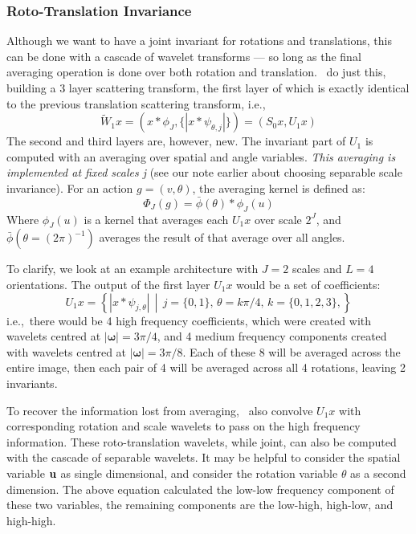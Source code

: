 \subsubsection{Roto-Translation Invariance}
  Although we want to have a joint invariant for rotations and translations,
  this can be done with a cascade of wavelet transforms --- so long as the
  final averaging operation is done over both rotation and translation. \Sifre\
  do just this, building a 3 layer scattering transform, the first layer of
  which is exactly identical to the previous translation scattering transform,
  i.e.,\
  \begin{equation}
    \tilde{W}_1 x = \left( x \ast \phi_J, \{|x \ast \psi_{\theta, j}|\} \right)
      = (S_0x, U_1x)
  \end{equation}
  The second and third layers are, however, new. The invariant part of $U_1$ is
  computed with an averaging over spatial and angle variables. \emph{This
  averaging  is implemented at fixed scales j} (see our note earlier about
  choosing separable scale invariance). For an action $g = (v, \theta)$, the
  averaging kernel is defined as:
  \begin{equation}
    \Phi_J(g) =  \bar{\phi}(\theta) \ast \phi_J(u)
  \end{equation}
  Where $\phi_J(u)$ is a kernel that averages each $U_1x$ over scale $2^J$,
  and $ \bar{\phi}(\theta= (2\pi)^{-1})$ averages the result of that average over all angles.

  To clarify, we look at an example architecture with $J=2$ scales and $L=4$
  orientations. The output of the first layer $U_1x$ would be a set of
  coefficients:
  \begin{equation}
    U_1x = \left\{ |x \ast \psi_{j, \theta} | \, \middle| \, j=\{0,1\}, \,
    \theta=k\pi/4, \, k= \{0,1,2,3\} ,\right\}
  \end{equation}
  i.e.,\ there would be 4 high frequency coefficients, which were created with
  wavelets centred at $|\bm{\omega}| = 3\pi/4$, and 4 medium frequency components
  created with wavelets centred at $|\bm{\omega}| = 3\pi/8$. Each of these 8 will
  be averaged across the entire image, then each pair of 4 will be averaged
  across all 4 rotations, leaving 2 invariants.

  To recover the information lost from averaging, \Sifre\ also convolve $U_1x$
  with corresponding rotation and scale wavelets to pass on the high frequency
  information. These roto-translation wavelets, while joint, can also be computed
  with the cascade of separable wavelets. It may be helpful to consider the
  spatial variable $\mathbf{u}$ as single dimensional, and consider the rotation
  variable $\theta$ as a second dimension. The above equation calculated the low-low
  frequency component of these two variables, the remaining components are the
  low-high, high-low, and high-high. 

